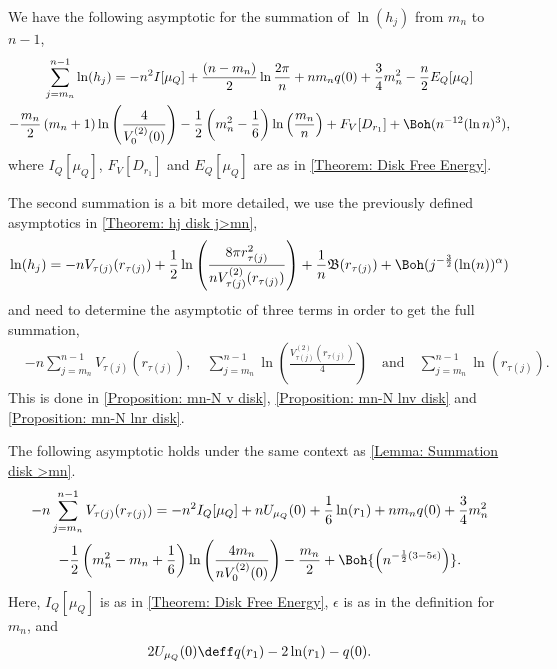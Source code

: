 \begin{lema}	\label{Lemma: Summation disk >mn}
	We have the following asymptotic for the summation of $\ln(h_j)$ from $m_n$ to $n-1$,
	\begin{multline}
		\sum_{j=m_n}^{n-1} \ln (h_j) = -n^2 I[\mu_Q] + \frac{(n-m_n)}{2} \ln{\frac{2\pi}{n}} +  n m_n q(0) + \frac{3}{4} m_n^2 - \frac{n}{2} E_Q[\mu_Q] \\ - \frac{m_n}{2} \left(m_n + 1\right) \ln{\left(\frac{4}{V^{(2)}_0(0)}\right)} - \frac{1}{2} \left( m_n^2 - \frac{1}{6} \right) \ln{\left(\frac{m_n}{n}\right)} + F_V[D_{r_1}] + \Boh(n^{-12} (\ln n)^3),
	\end{multline}
	where $I_Q[\mu_Q] $,  $F_V[D_{r_1}]$ and $E_Q[\mu_Q]$ are as in \autoref{Theorem: Disk Free Energy}.
\end{lema}

The second summation is a bit more detailed, we use the previously defined asymptotics in \autoref{Theorem: hj disk j>mn},
\begin{equation}
	\ln(h_j) = -n V_{\tau(j)} (r_{\tau(j)}) + \frac{1}{2} \ln{\left( \frac{8\pi r^2_{\tau(j)}}{n V^{(2)}_{\tau(j)}(r_{\tau(j)})}  \right)} + \frac{1}{n} \mathfrak{B}(r_{\tau(j)}) + \Boh(j^{-\frac{3}{2}} (\ln(n))^\alpha)
\end{equation}
and need to determine the asymptotic of three terms in order to get the full summation,
\begin{align}
	& -n\sum_{j=m_n}^{n-1} V_{\tau(j)}(r_{\tau(j)}), \quad \sum_{j=m_n}^{n-1} \ln \left( \frac{V^{(2)}_{\tau(j)}(r_{\tau(j)})}{4}\right)  \quad \text{and} \quad \sum_{j=m_n}^{n-1}  \ln(r_{\tau(j)}).
\end{align}
This is done in \autoref{Proposition: mn-N v disk}, \autoref{Proposition: mn-N lnv disk} and \autoref{Proposition: mn-N lnr disk}.

\begin{proposicao}	\label{Proposition: mn-N v disk}
	The following asymptotic holds under the same context as \autoref{Lemma: Summation disk >mn}.
	\begin{multline}
		-n \sum_{j=m_n}^{n-1} V_{\tau(j)}(r_{\tau(j)}) = -n^2 I_Q[\mu_Q]  + n U_{\mu_Q}(0) + \frac{1}{6} \ln(r_1) + n m_n q(0) + \frac{3}{4} m_n^2 \\ - \frac{1}{2} \left(m_n^2 - m_n + \frac{1}{6} \right) \ln{\left(\frac{4 m_n}{n V^{(2)}_0(0)}\right)} - \frac{m_n}{2} + \Boh{\left(n^{-\frac{1}{2}(3-5\epsilon)}\right)}.
	\end{multline}
	Here, $I_Q[\mu_Q] $ is as in \autoref{Theorem: Disk Free Energy}, $\epsilon$ is as in the definition for $m_n$, and
	\begin{equation}
		 2 U_{\mu_Q}(0) \deff q(r_1) - 2 \ln(r_1) - q(0).
	\end{equation}
\end{proposicao}

